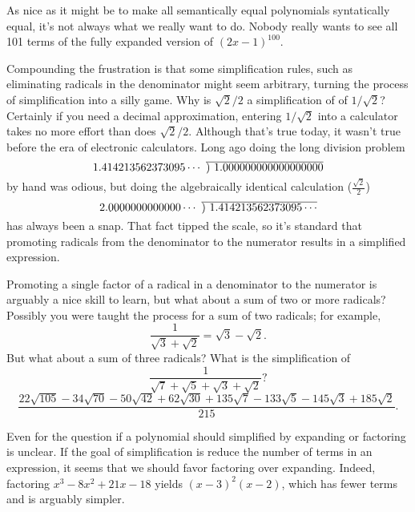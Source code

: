 \documentclass[12pt,fleqn]{article}
\newcommand\showdiv[1]{\overline{\smash{)}#1}}
\begin{document}
As nice as it might be to make all semantically equal polynomials syntatically equal, it's not always what we really want to do.  Nobody
really wants to see all 101 terms of the fully expanded version of $(2  x-1)^100$.

\begin{comment}
You needn't be especially cynical to speculate that the only
reason for the requirement of simplified answers is to reduce the 
teacher's burden of grading papers--it is much easier to simply mark 
any answer that isn't visually identical to the answer key as wrong.
\end{comment}
Compounding the frustration is that some simplification rules, such as eliminating radicals in the 
denominator might seem arbitrary, turning the process of simplification 
into a silly game. Why is $\sqrt{2}/2$ a simplification of 
of $1/\sqrt{2}$? Certainly if you need a decimal approximation, entering
$1/\sqrt{2}$ into a calculator takes no more effort than does $\sqrt{2}/2$. Although
that's true today, it wasn't true before the era of electronic calculators. Long
ago doing the long division problem 
\[
   1.414213562373095\cdots \, \, \showdiv{\, \, 1.000000000000000000}
\]
by hand was odious, but doing the algebraically identical calculation 
(\(\frac{\sqrt{2}}{2} \))
\[
   2.0000000000000\cdots \,\, \showdiv{\, \, 1.414213562373095\cdots}
 \]
 has always been a snap. That fact tipped the scale, so it's standard that promoting
 radicals from the denominator to the numerator results in a simplified
 expression.

 Promoting a single factor of a radical in a denominator to the numerator
 is arguably a nice skill to learn, but what about a sum of two or more
 radicals? Possibly you were taught the process for a sum of two radicals; for
 example,
 \begin{equation}
   \frac{1}{\sqrt{3}+\sqrt{2}} = \sqrt{3}-\sqrt{2}.
 \end{equation}
But what about a sum of three radicals? What is the simplification of
\begin{equation}
   \frac{1}{\sqrt{7}+\sqrt{5}+\sqrt{3}+\sqrt{2}} \mbox{?}
\end{equation}
\begin{equation}
   \frac{22 \sqrt{105}- 34 \sqrt{70}- 50 \sqrt{42}+62 \sqrt{30}+135 \sqrt{7}- 133 \sqrt{5}-145 \sqrt{3}+185 \sqrt{2}}{215}.
\end{equation}


 Even for the question if a polynomial should simplified by expanding
 or factoring is unclear. If the goal of simplification is reduce the
 number of terms in an expression, it seems that we should favor 
 factoring over expanding. Indeed, factoring ${{x}^{3}}-8 {{x}^{2}}+21 x-18$
 yields ${{\left( x-3\right) }^{2}} \left( x-2\right)$, which has fewer
 terms and is arguably simpler. 
\end{document}
